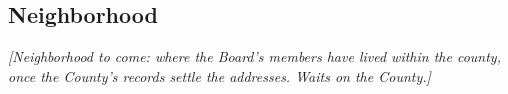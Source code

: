 \subsection{Neighborhood}

\textit{[Neighborhood to come: where the Board's members have lived within the
county, once the County's records settle the addresses. Waits on the County.]}

